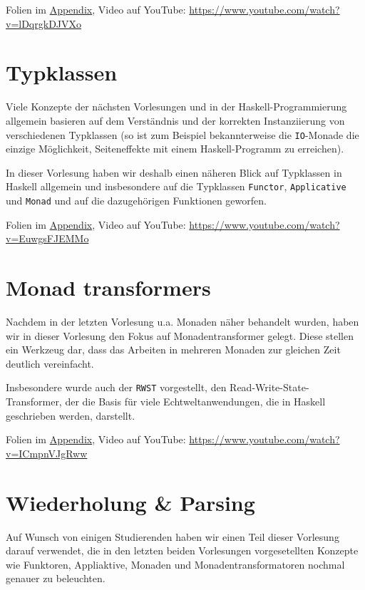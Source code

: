 \documentclass[10pt,a4paper]{article}
\begin{document}
\smallskip\smallskip
Folien im \hyperref[v1]{Appendix}, Video auf YouTube: \;\url{https://www.youtube.com/watch?v=lDqrgkDJVXo}

\section{Typklassen}

Viele Konzepte der nächsten Vorlesungen und in der Haskell-Programmierung allgemein basieren auf dem Verständnis und der korrekten Instanziierung von verschiedenen Typklassen (so ist zum Beispiel bekannterweise die \texttt{IO}-Monade die einzige Möglichkeit, Seiteneffekte mit einem Haskell-Programm zu erreichen).

In dieser Vorlesung haben wir deshalb einen näheren Blick auf Typklassen in Haskell allgemein und insbesondere auf die Typklassen \texttt{Functor}, \texttt{Applicative} und \texttt{Monad} und auf die dazugehörigen Funktionen geworfen.

\smallskip\smallskip
Folien im \hyperref[v2]{Appendix}, Video auf YouTube: \;\url{https://www.youtube.com/watch?v=EuwgsFJEMMo}

\section{Monad transformers}

Nachdem in der letzten Vorlesung u.a. Monaden näher behandelt wurden, haben wir in dieser Vorlesung den Fokus auf Monadentransformer gelegt. Diese stellen ein Werkzeug dar, dass das Arbeiten in mehreren Monaden zur gleichen Zeit deutlich vereinfacht.

Insbesondere wurde auch der \texttt{RWST} vorgestellt, den Read-Write-State-Transformer, der die Basis für viele Echtweltanwendungen, die in Haskell geschrieben werden, darstellt.

\smallskip\smallskip
Folien im \hyperref[v3]{Appendix}, Video auf YouTube: \;\url{https://www.youtube.com/watch?v=ICmpnVJgRww}

\section{Wiederholung \& Parsing}

Auf Wunsch von einigen Studierenden haben wir einen Teil dieser Vorlesung darauf verwendet, die in den letzten beiden Vorlesungen vorgesetellten Konzepte wie Funktoren, Appliaktive, Monaden und Monadentransformatoren nochmal genauer zu beleuchten.
\end{document}
